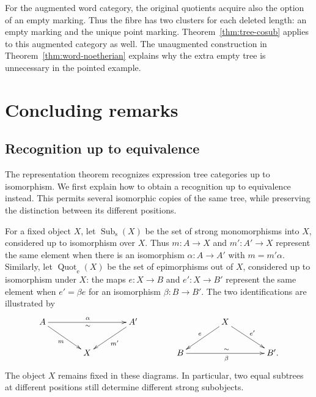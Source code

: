 \documentclass[11pt,a4paper]{article}
\theoremstyle{plain}
\theoremstyle{definition}
\theoremstyle{remark}
\begin{document}
For the augmented word category, the original quotients acquire
also the option of an empty marking. Thus the fibre has two
clusters for each deleted length: an empty marking and the
unique point marking. Theorem~\ref{thm:tree-cosub} applies to
this augmented category as well. The unaugmented construction
in Theorem~\ref{thm:word-noetherian} explains why the extra
empty tree is unnecessary in the pointed example.

\section{Concluding remarks}\label{concl:section}

\subsection{Recognition up to equivalence}\label{concl:equivalence-axioms}

The representation theorem recognizes expression tree categories up to
isomorphism. We first explain how to obtain a recognition up to
equivalence instead. This permits several isomorphic copies of the
same tree, while preserving the distinction between its
different positions.

For a fixed object $X$, let $\operatorname{Sub}_{\mathrm{s}}(X)$
be the set of strong monomorphisms into $X$, considered up to
isomorphism over $X$. Thus $m:A\to X$ and $m':A'\to X$ represent
the same element when there is an isomorphism $\alpha:A\to A'$
with $m=m'\alpha$. Similarly, let
$\operatorname{Quot}_{\mathrm{e}}(X)$ be the set of epimorphisms
out of $X$, considered up to isomorphism under $X$: the maps
$e:X\to B$ and $e':X\to B'$ represent the same element when
$e'=\beta e$ for an isomorphism $\beta:B\to B'$.
The two identifications are illustrated by
\[
\xymatrix@C=3.8em@R=2.3em{
A\ar[rr]^{\alpha}_{\sim}\ar[dr]_m&&A'\ar[dl]^{m'}\\
&X&
}
\qquad\qquad
\xymatrix@C=3.8em@R=2.3em{
&X\ar[dl]_e\ar[dr]^{e'}&\\
B\ar[rr]_{\beta}^{\sim}&&B'.
}
\]
The object $X$ remains fixed in these diagrams. In particular,
two equal subtrees at different positions still determine
different strong subobjects.
\end{document}
